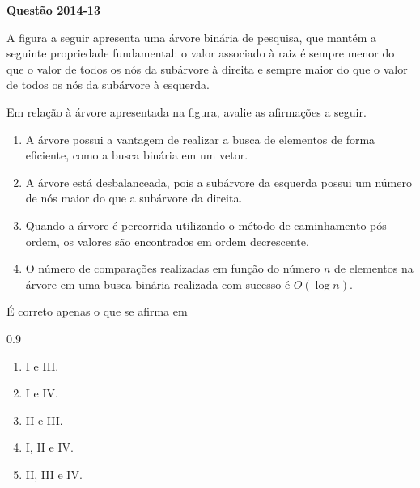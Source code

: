 \documentclass[12pt,a4paper]{article}
\newenvironment{question}[1]{%
    \pdfbookmark[3]{Questão #1}{q:#1}
    \label{q:#1}
    \bigskip\par\noindent
    \textbf{Questão #1} \dotfill
    \medskip\par\nopagebreak\noindent
    \ignorespaces
}{%
    \noindent\dotfill\medskip
}
\begin{document}
\begin{question}{2014-13}
A figura a seguir apresenta uma árvore binária de pesquisa, que mantém a seguinte propriedade fundamental:
o valor associado à raiz é sempre menor do que o valor de todos os nós da subárvore à direita e sempre maior do que o valor de todos os nós da subárvore à esquerda.

\vspace{-0.5cm}
\begin{center}
\end{center}

\noindent
Em relação à árvore apresentada na figura, avalie as afirmações a seguir.

\begin{enumerate}[label=\Roman*.]
    \item A árvore possui a vantagem de realizar a busca de elementos de forma eficiente, como a busca binária em um vetor.
    \item A árvore está desbalanceada, pois a subárvore da esquerda possui um número de nós maior do que a subárvore da direita.
    \item Quando a árvore é percorrida utilizando o método de caminhamento pós-ordem, os valores são encontrados em ordem decrescente.
    \item O número de comparações realizadas em função do número $n$ de elementos na árvore em uma busca binária realizada com sucesso é $O(\log n)$.
\end{enumerate}

\noindent
É correto apenas o que se afirma em

\begin{spacing}{0.9}
\begin{small}
\begin{enumerate}[label=\Alph*)]
    \item I e III.
    \item I e IV.
    \item II e III.
    \item I, II e IV.
    \item II, III e IV.
\end{enumerate}
\end{small}
\end{spacing}
\end{question}
\end{document}
